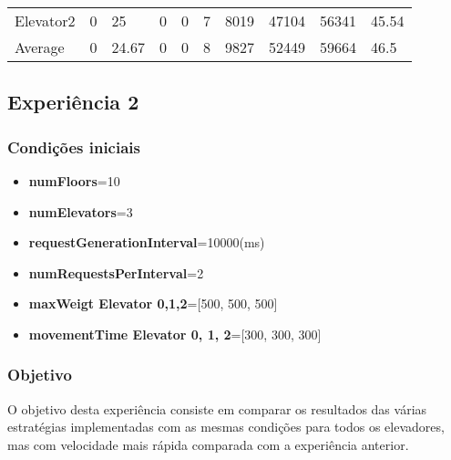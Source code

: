 ﻿\documentclass[a4paper]{article}
\begin{document}
\begin{table}[h]
\begin{tabular}{@{}llllllllll@{}}
Elevator2 & 0        & 25            & 0           & 0                                                               & 7                                                                  & 8019                                                         & 47104                                                 & 56341                                                   & 45.54         \\
Average   & 0     & 24.67         & 0        & 0                                                               & 8                                                               & 9827                                                         & 52449                                                 &  59664                                                  & 46.5          \\ \bottomrule
\end{tabular}
\end{table}

\subsection{Experiência 2}

\subsubsection{Condições iniciais}

\begin{itemize}
\item \textbf{numFloors}=10
\item \textbf{numElevators}=3
\item \textbf{requestGenerationInterval}=10000(ms)
\item \textbf{numRequestsPerInterval}=2
\item \textbf{maxWeigt Elevator 0,1,2}=[500, 500, 500]
\item \textbf{movementTime Elevator 0, 1, 2}=[300, 300, 300]
\end{itemize}

\subsubsection{Objetivo} 

O objetivo desta experiência consiste em comparar os resultados das várias estratégias implementadas com as mesmas condições para todos os elevadores, mas com velocidade mais rápida comparada com a experiência anterior.
\end{document}

